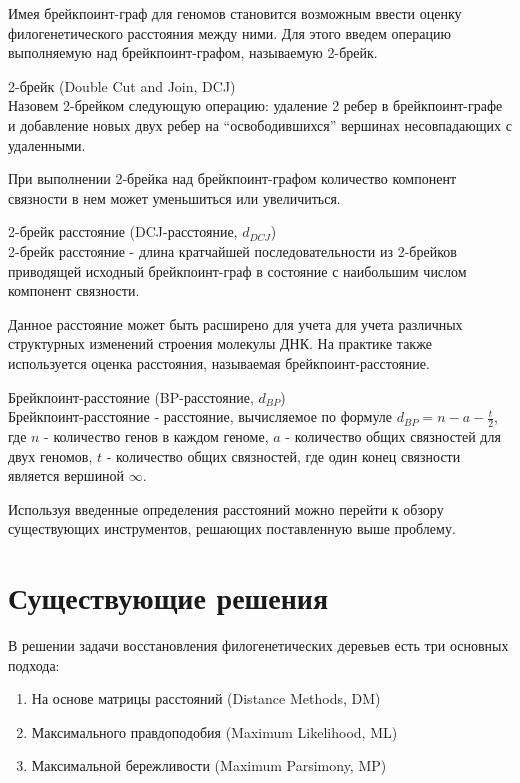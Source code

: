 Имея брейкпоинт-граф для геномов становится возможным ввести оценку филогенетического расстояния между ними.
Для этого введем операцию выполняемую над брейкпоинт-графом, называемую 2-брейк.
\begin{define}{2-брейк (Double Cut and Join, DCJ)} \\
  Назовем 2-брейком следующую операцию: удаление 2 ребер в брейкпоинт-графе и добавление новых двух ребер на ``освободившихся'' вершинах
  несовпадающих с удаленными.
\end{define}
При выполнении 2-брейка над брейкпоинт-графом количество компонент связности в нем может уменьшиться или увеличиться.
\begin{define}{2-брейк расстояние (DCJ-расстояние, $d_{DCJ}$)} \\
  2-брейк расстояние - длина кратчайшей последовательности из 2-брейков приводящей
  исходный брейкпоинт-граф в состояние с наибольшим числом компонент связности.
\end{define}

Данное расстояние может быть расширено для учета для учета различных структурных изменений строения молекулы ДНК.
На практике также используется оценка расстояния, называемая брейкпоинт-расстояние.

\begin{define}{Брейкпоинт-расстояние (BP-расстояние, $d_{BP}$)} \\
  Брейкпоинт-расстояние - расстояние, вычисляемое по формуле $d_{BP} = n - a - \frac{t}{2}$,
  где $n$ - количество генов в каждом геноме,
  $a$ - количество общих связностей для двух геномов, $t$ - количество
  общих связностей, где один конец связности является вершиной $\infty$.
\end{define}

Используя введенные определения расстояний можно перейти к обзору существующих инструментов,
решающих поставленную выше проблему.

\section{Существующие решения}

В решении задачи восстановления филогенетических деревьев есть три основных подхода:
\begin{enumerate}
  \item На основе матрицы расстояний (Distance Methods, DM)
  \item Максимального правдоподобия (Maximum Likelihood, ML)
  \item Максимальной бережливости (Maximum Parsimony, MP)
\end{enumerate}


